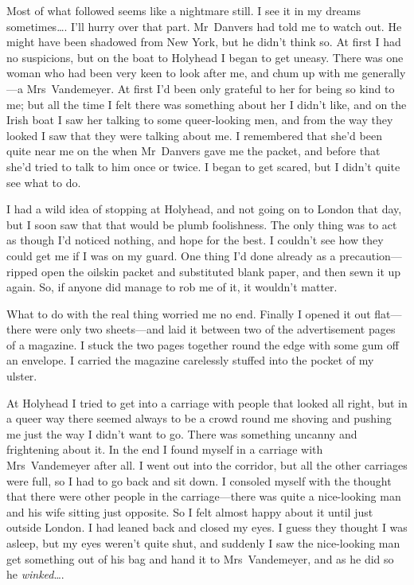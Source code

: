 Most of what followed seems like a nightmare still. I see it in my dreams sometimes\dots. I'll hurry over that part. Mr~Danvers had told me to watch out. He might have been shadowed from New York, but he didn't think so. At first I had no suspicions, but on the boat to Holyhead I began to get uneasy. There was one woman who had been very keen to look after me, and chum up with me generally—a Mrs~Vandemeyer. At first I'd been only grateful to her for being so kind to me; but all the time I felt there was something about her I didn't like, and on the Irish boat I saw her talking to some queer-looking men, and from the way they looked I saw that they were talking about me. I remembered that she'd been quite near me on the  when Mr~Danvers gave me the packet, and before that she'd tried to talk to him once or twice. I began to get scared, but I didn't quite see what to do.

I had a wild idea of stopping at Holyhead, and not going on to London that day, but I soon saw that that would be plumb foolishness. The only thing was to act as though I'd noticed nothing, and hope for the best. I couldn't see how they could get me if I was on my guard. One thing I'd done already as a precaution—ripped open the oilskin packet and substituted blank paper, and then sewn it up again. So, if anyone did manage to rob me of it, it wouldn't matter.

What to do with the real thing worried me no end. Finally I opened it out flat—there were only two sheets—and laid it between two of the advertisement pages of a magazine. I stuck the two pages together round the edge with some gum off an envelope. I carried the magazine carelessly stuffed into the pocket of my ulster.

At Holyhead I tried to get into a carriage with people that looked all right, but in a queer way there seemed always to be a crowd round me shoving and pushing me just the way I didn't want to go. There was something uncanny and frightening about it. In the end I found myself in a carriage with Mrs~Vandemeyer after all. I went out into the corridor, but all the other carriages were full, so I had to go back and sit down. I consoled myself with the thought that there were other people in the carriage—there was quite a nice-looking man and his wife sitting just opposite. So I felt almost happy about it until just outside London. I had leaned back and closed my eyes. I guess they thought I was asleep, but my eyes weren't quite shut, and suddenly I saw the nice-looking man get something out of his bag and hand it to Mrs~Vandemeyer, and as he did so he \emph{winked}\dots.

